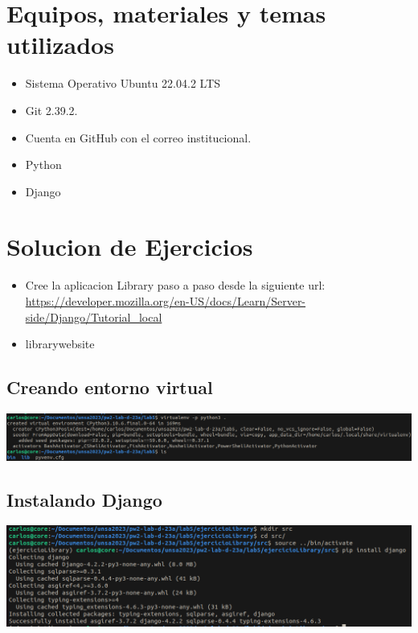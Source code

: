 \documentclass{article}
\begin{document}
\section{Equipos, materiales y temas utilizados}
\begin{itemize}
	\item Sistema Operativo Ubuntu 22.04.2 LTS
	\item Git 2.39.2.
	\item Cuenta en GitHub con el correo institucional.
	\item Python
	\item Django
\end{itemize}

\section{Solucion de Ejercicios}
\begin{itemize}
	\item Cree la aplicacion Library paso a paso desde la siguiente url:
	\url {https://developer.mozilla.org/en-US/docs/Learn/Server-side/Django/Tutorial_local}
	\item librarywebsite
\end{itemize}

\subsection{Creando entorno virtual}
\begin{center}
    \includegraphics[scale=0.3]{img/entorno virtual.png}
\end{center}

\subsection{Instalando Django}
\begin{center}
    \includegraphics[scale=0.3]{img/instalando django.png}
\end{center}
\end{document}
